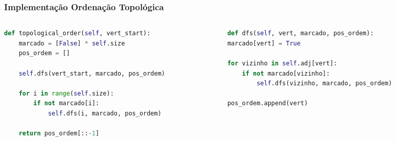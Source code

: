 \documentclass[aspectratio=169,usenames,dvipsnames]{beamer}
\begin{document}
\begin{frame}[fragile]  %
  \frametitle{Implementação Ordenação Topológica}

  \begin{columns}
    \begin{column}{0.5\textwidth}
      \begin{lstlisting}[language=Python]
def topological_order(self, vert_start):
    marcado = [False] * self.size
    pos_ordem = []

    self.dfs(vert_start, marcado, pos_ordem)

    for i in range(self.size):
        if not marcado[i]:
            self.dfs(i, marcado, pos_ordem)

    return pos_ordem[::-1]
      \end{lstlisting}
    \end{column}
    \begin{column}{0.5\textwidth}
      \begin{lstlisting}[language=Python]
def dfs(self, vert, marcado, pos_ordem):
marcado[vert] = True

for vizinho in self.adj[vert]:
    if not marcado[vizinho]:
        self.dfs(vizinho, marcado, pos_ordem)

pos_ordem.append(vert)
      \end{lstlisting}
    \end{column}
  \end{columns}

\end{frame}
\end{document}
